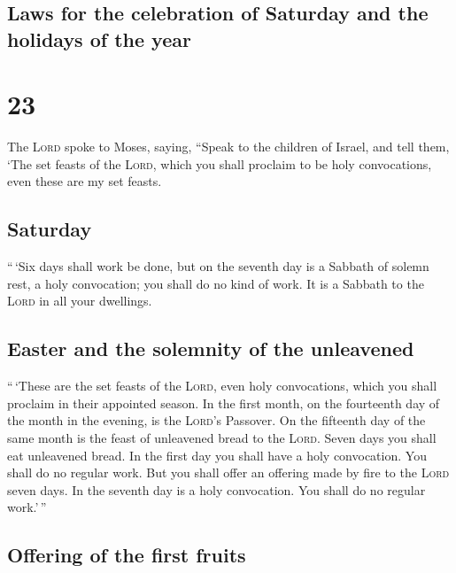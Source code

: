 \hypertarget{laws-for-the-celebration-of-saturday-and-the-holidays-of-the-year}{%
\subsection{Laws for the celebration of Saturday and the holidays of the
year}\label{laws-for-the-celebration-of-saturday-and-the-holidays-of-the-year}}

\hypertarget{section-22}{%
\section{23}\label{section-22}}

 The \textsc{Lord} spoke to Moses, saying, 
``Speak to the children of Israel, and tell them, `The set feasts of the
\textsc{Lord}, which you shall proclaim to be holy convocations, even
these are my set feasts.

\hypertarget{saturday}{%
\subsection{Saturday}\label{saturday}}

 ``\,`Six days shall work be done, but on the seventh day
is a Sabbath of solemn rest, a holy convocation; you shall do no kind of
work. It is a Sabbath to the \textsc{Lord} in all your dwellings.

\hypertarget{easter-and-the-solemnity-of-the-unleavened}{%
\subsection{Easter and the solemnity of the
unleavened}\label{easter-and-the-solemnity-of-the-unleavened}}

 ``\,`These are the set feasts of the \textsc{Lord}, even
holy convocations, which you shall proclaim in their appointed season.
 In the first month, on the fourteenth day of the month in
the evening, is the \textsc{Lord}'s Passover.  On the
fifteenth day of the same month is the feast of unleavened bread to the
\textsc{Lord}. Seven days you shall eat unleavened bread. 
In the first day you shall have a holy convocation. You shall do no
regular work.  But you shall offer an offering made by
fire to the \textsc{Lord} seven days. In the seventh day is a holy
convocation. You shall do no regular work.'\,''

\hypertarget{offering-of-the-first-fruits}{%
\subsection{Offering of the first
fruits}\label{offering-of-the-first-fruits}}

